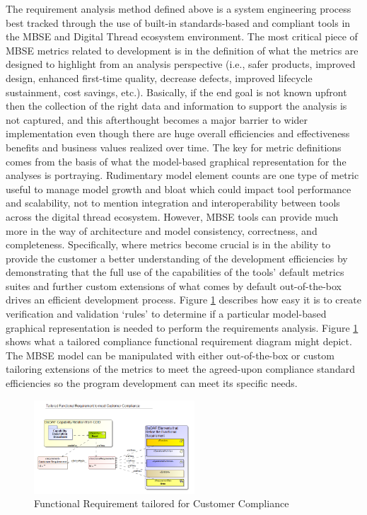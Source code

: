 \documentclass[num-refs]{wiley-article}
\begin{document}
The requirement analysis method defined above is a system engineering process best tracked through the use of built-in standards-based and compliant tools in the MBSE and Digital Thread ecosystem environment. The most critical piece of MBSE metrics related to development is in the definition of what the metrics are designed to highlight from an analysis perspective (i.e., safer products, improved design, enhanced first-time quality, decrease defects, improved lifecycle sustainment, cost savings, etc.). Basically, if the end goal is not known upfront then the collection of the right data and information to support the analysis is not captured, and this afterthought becomes a major barrier to wider implementation even though there are huge overall efficiencies and effectiveness benefits and business values realized over time. The key for metric definitions comes from the basis of what the model-based graphical representation for the analyses is portraying. Rudimentary model element counts are one type of metric useful to manage model growth and bloat which could impact tool performance and scalability, not to mention integration and interoperability between tools across the digital thread ecosystem. However, MBSE tools can provide much more in the way of architecture and model consistency, correctness, and completeness. Specifically,  where metrics become crucial is in the ability to provide the customer a better understanding of the development efficiencies by demonstrating that the full use of the capabilities of the tools'  default metrics suites and further custom extensions of what comes by default out-of-the-box drives an efficient development process. Figure \ref{fig6} describes how easy it is to create verification and validation `rules' to determine if a particular model-based graphical representation is needed to perform the requirements analysis. Figure \ref{fig6} shows what a tailored compliance functional requirement diagram might depict. The MBSE model can be manipulated with either out-of-the-box or custom tailoring extensions of the metrics to meet the agreed-upon compliance standard efficiencies so the program development can meet its specific needs.

\begin{figure}
\centering
\includegraphics[width=6cm]{Images/Capture5.png}
\caption{Functional Requirement tailored for Customer Compliance}
\label{fig6}
\end{figure}
\end{document}
